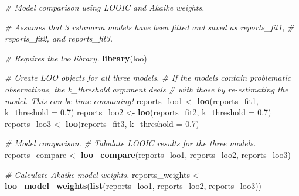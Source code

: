 \documentclass[
  english,
  doc]{apa6}
\newenvironment{Shaded}{\begin{snugshade}}{\end{snugshade}}
\newcommand{\CommentTok}[1]{\textcolor[rgb]{0.56,0.35,0.01}{\textit{#1}}}
\newcommand{\DataTypeTok}[1]{\textcolor[rgb]{0.13,0.29,0.53}{#1}}
\newcommand{\FloatTok}[1]{\textcolor[rgb]{0.00,0.00,0.81}{#1}}
\newcommand{\KeywordTok}[1]{\textcolor[rgb]{0.13,0.29,0.53}{\textbf{#1}}}
\newcommand{\NormalTok}[1]{#1}
\newcommand{\StringTok}[1]{\textcolor[rgb]{0.31,0.60,0.02}{#1}}
\begin{document}
\begin{Shaded}
\begin{Highlighting}[]
\CommentTok{\# Model comparison using LOOIC and Akaike weights.}

\CommentTok{\# Assumes that 3 rstanarm models have been fitted and saved as reports\_fit1,}
\CommentTok{\# reports\_fit2, and reports\_fit3.}

\CommentTok{\# Requires the loo library.}
\KeywordTok{library}\NormalTok{(loo)}

\CommentTok{\# Create LOO objects for all three models.}
\CommentTok{\# If the models contain problematic observations, the k\_threshold argument deals}
\CommentTok{\# with those by re{-}estimating the model. This can be time consuming!}
\NormalTok{reports\_loo1 \textless{}{-}}\StringTok{ }\KeywordTok{loo}\NormalTok{(reports\_fit1, }\DataTypeTok{k\_threshold =} \FloatTok{0.7}\NormalTok{)}
\NormalTok{reports\_loo2 \textless{}{-}}\StringTok{ }\KeywordTok{loo}\NormalTok{(reports\_fit2, }\DataTypeTok{k\_threshold =} \FloatTok{0.7}\NormalTok{)}
\NormalTok{reports\_loo3 \textless{}{-}}\StringTok{ }\KeywordTok{loo}\NormalTok{(reports\_fit3, }\DataTypeTok{k\_threshold =} \FloatTok{0.7}\NormalTok{)}

\CommentTok{\# Model comparison.}
\CommentTok{\# Tabulate LOOIC results for the three models.}
\NormalTok{reports\_compare \textless{}{-}}\StringTok{ }\KeywordTok{loo\_compare}\NormalTok{(reports\_loo1, reports\_loo2, reports\_loo3)}

\CommentTok{\# Calculate Akaike model weights.}
\NormalTok{reports\_weights \textless{}{-}}\StringTok{ }\KeywordTok{loo\_model\_weights}\NormalTok{(}\KeywordTok{list}\NormalTok{(reports\_loo1, reports\_loo2, reports\_loo3))}
\end{Highlighting}
\end{Shaded}

\begin{table}

\caption{\label{tab:modelcomparison1}Three models arranged in descending order of predictive accuracy according to the approximate leave-one-out cross-validation information criterion (LOOIC).}
\centering
{}
\end{table}
\end{document}

